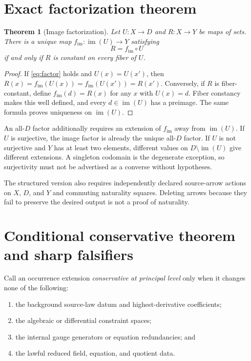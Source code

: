 \documentclass[11pt]{article}
\newtheorem{theorem}{Theorem}
\newcommand{\im}{\operatorname{im}}
\begin{document}
\section{Exact factorization theorem}

\begin{theorem}[Image factorization]
Let $U:X\to D$ and $R:X\to Y$ be maps of sets.  There is a unique map
$f_{\im}:\im(U)\to Y$ satisfying
\begin{equation}
 R=f_{\im}\circ U
 \label{eq:factor}
\end{equation}
if and only if $R$ is constant on every fiber of $U$.
\end{theorem}

\begin{proof}
If \eqref{eq:factor} holds and $U(x)=U(x')$, then
$R(x)=f_{\im}(U(x))=f_{\im}(U(x'))=R(x')$.  Conversely, if $R$ is
fiber-constant, define $f_{\im}(d)=R(x)$ for any $x$ with $U(x)=d$.
Fiber constancy makes this well defined, and every $d\in\im(U)$ has a
preimage.  The same formula proves uniqueness on $\im(U)$.
\end{proof}

An all-$D$ factor additionally requires an extension of $f_{\im}$ away from
$\im(U)$.  If $U$ is surjective, the image factor is already the unique
all-$D$ factor.  If $U$ is not surjective and $Y$ has at least two elements,
different values on $D\setminus\im(U)$ give different extensions.  A
singleton codomain is the degenerate exception, so surjectivity must not be
advertised as a converse without hypotheses.

The structured version also requires independently declared source-arrow
actions on $X$, $D$, and $Y$ and commuting naturality squares.  Deleting
arrows because they fail to preserve the desired output is not a proof of
naturality.

\section{Conditional conservative theorem and sharp falsifiers}

Call an occurrence extension \emph{conservative at principal level} only when
it changes none of the following:
\begin{enumerate}[label=(\roman*)]
 \item the background source-law datum and highest-derivative coefficients;
 \item the algebraic or differential constraint spaces;
 \item the internal gauge generators or equation redundancies; and
 \item the lawful reduced field, equation, and quotient data.
\end{enumerate}
\end{document}
